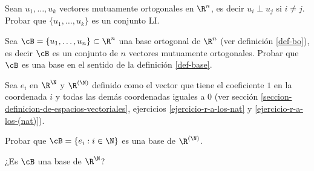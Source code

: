 \begin{enumex}
        \item Sean $u_1,\ldots,u_k$ vectores mutuamente ortogonales en $\R^n$,  es decir $u_i \perp u_j$  si $i \ne j$. Probar que  $\{u_1,\ldots,u_k\}$ es un conjunto LI.
        \item 
        Sea $\cB =\{u_1,\ldots,u_n\}\subset \R^n$  una base ortogonal de $\R^n$ (ver definición \ref{def-bo}),  es decir $\cB$  es un conjunto de $n$ vectores mutuamente ortogonales. Probar  que $\cB$ es una base en el sentido de la definición \ref{def-base}.   
        \item Sea $e_i$ en $\R^\N$ y $\R^{(\N)}$ definido como el vector que tiene el coeficiente $1$  en la coordenada $i$  y todas las demás coordenadas iguales a $0$ (ver sección \ref{seccion-definicion-de-espacios-vectoriales}, ejercicios \ref{ejercicio-r-a-los-nat} y \ref{ejercicio-r-a-los-(nat)}).
        
        Probar que $\cB = \{e_i: i \in \N\}$ es una base de  $\R^{(\N)}$.

        ¿Es $\cB$ una base de  $\R^\N$?
    \end{enumex}
